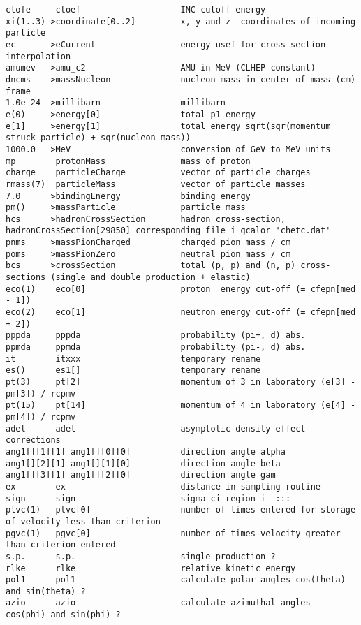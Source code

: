 \begin{verbatim}
ctofe     ctoef                    INC cutoff energy
xi(1..3) >coordinate[0..2]         x, y and z -coordinates of incoming particle 
ec       >eCurrent                 energy usef for cross section interpolation
amumev   >amu_c2                   AMU in MeV (CLHEP constant)
dncms    >massNucleon              nucleon mass in center of mass (cm) frame
1.0e-24  >millibarn                millibarn
e(0)     >energy[0]                total p1 energy                   
e[1]     >energy[1]                total energy sqrt(sqr(momentum struck particle) + sqr(nucleon mass))      
1000.0   >MeV                      conversion of GeV to MeV units
mp        protonMass               mass of proton
charge    particleCharge           vector of particle charges
rmass(7)  particleMass             vector of particle masses
7.0      >bindingEnergy            binding energy
pm()     >massParticle             particle mass
hcs      >hadronCrossSection       hadron cross-section, hadronCrossSection[29850] corresponding file i gcalor 'chetc.dat'
pnms     >massPionCharged          charged pion mass / cm
poms     >massPionZero             neutral pion mass / cm
bcs      >crossSection             total (p, p) and (n, p) cross-sections (single and double production + elastic)
eco(1)    eco[0]                   proton  energy cut-off (= cfepn[med - 1]) 
eco(2)    eco[1]                   neutron energy cut-off (= cfepn[med + 2])
pppda     pppda                    probability (pi+, d) abs.
ppmda     ppmda                    probability (pi-, d) abs.
it        itxxx                    temporary rename
es()      es1[]                    temporary rename
pt(3)     pt[2]                    momentum of 3 in laboratory (e[3] - pm[3]) / rcpmv
pt(15)    pt[14]                   momentum of 4 in laboratory (e[4] - pm[4]) / rcpmv
adel      adel                     asymptotic density effect corrections
ang1[][1][1] ang1[][0][0]          direction angle alpha
ang1[][2][1] ang1[][1][0]          direction angle beta
ang1[][3][1] ang1[][2][0]          direction angle gam
ex        ex                       distance in sampling routine 
sign      sign                     sigma ci region i  :::  
plvc(1)   plvc[0]                  number of times entered for storage of velocity less than criterion 
pgvc(1)   pgvc[0]                  number of times velocity greater than criterion entered 
s.p.      s.p.                     single production ?
rlke      rlke                     relative kinetic energy
pol1      pol1                     calculate polar angles cos(theta) and sin(theta) ? 
azio      azio                     calculate azimuthal angles  cos(phi) and sin(phi) ?

\end{verbatim}
